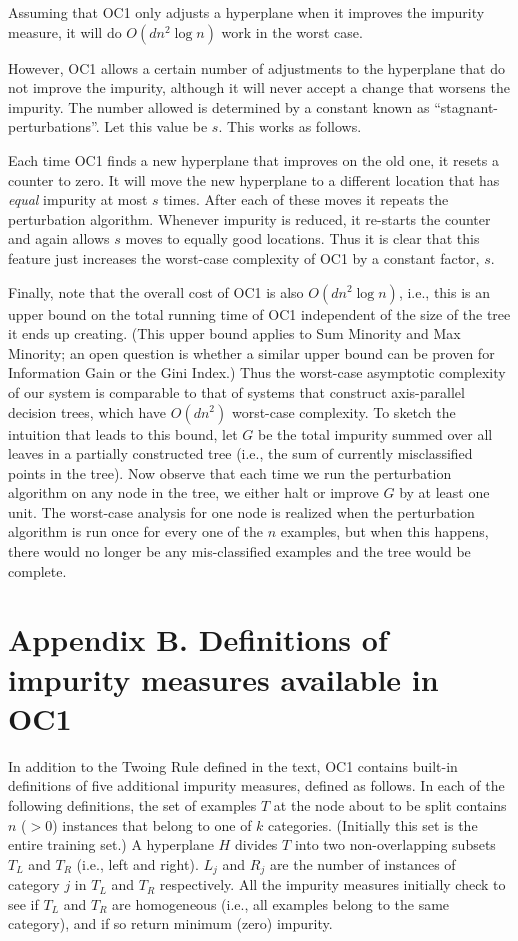 Assuming that OC1 only adjusts a hyperplane when it improves the
impurity measure, it will do $O(dn^2 \log n)$ work in the worst case.

However, OC1 allows a certain number of adjustments to the hyperplane
that do not improve the impurity, although it will never accept a
change that worsens the impurity.  The number allowed is
determined by a constant known as ``stagnant-perturbations''.  Let
this value be $s$.  This works as follows.

Each time OC1 finds a new hyperplane that improves on the old one,
it resets a counter to zero.  It will move the new hyperplane to
a different location that has {\it equal} impurity at most $s$
times.  After each of these moves it repeats the perturbation 
algorithm.  Whenever impurity is reduced, it re-starts the
counter and again allows $s$ moves to equally good locations.
Thus it is clear that this feature just increases the worst-case
complexity of OC1 by a constant factor, $s$.

Finally, note that the overall cost of OC1 is also $O(dn^2 \log n)$,
i.e., this is an upper bound on the total running time of OC1
independent of the size of the tree it ends up creating.  (This upper
bound applies to Sum Minority and Max Minority; an open question is
whether a similar upper bound can be proven for Information Gain or
the Gini Index.)  Thus the worst-case asymptotic complexity of our
system is comparable to that of systems that construct axis-parallel
decision trees, which have $O(dn^2)$ worst-case complexity.  To sketch
the intuition that leads to this bound, let $G$ be the total impurity
summed over all leaves in a partially constructed tree (i.e., the sum
of currently misclassified points in the tree).  Now observe that each
time we run the perturbation algorithm on any node in the tree, we
either halt or improve $G$ by at least one unit.  The worst-case
analysis for one node is realized when the perturbation algorithm is run
once for every one of the $n$ examples, but when this happens, there
would no longer be any mis-classified examples and the tree would be
complete.

\section*{Appendix B. Definitions of impurity measures available in OC1}
\label{appendix:2}
In addition to the Twoing Rule defined in the text, OC1 contains
built-in definitions of five additional impurity measures, defined as
follows.  In each of the following definitions, the set of examples
$T$ at the node about to be split contains $n$ ($>0$) instances that
belong to one of $k$ categories.  (Initially this set is the entire
training set.)  A hyperplane $H$ divides $T$ into two non-overlapping
subsets $T_L$ and $T_R$ (i.e., left and right).  $L_j$ and $R_j$ are
the number of instances of category $j$ in $T_L$ and $T_R$
respectively.  All the impurity measures initially check to see if
$T_L$ and $T_R$ are homogeneous (i.e., all examples belong to the same
category), and if so return minimum (zero) impurity.

